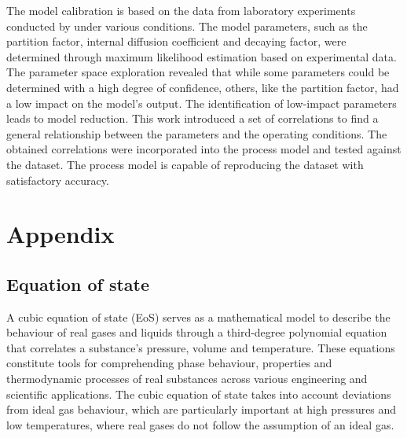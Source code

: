 \documentclass[a4paper,fleqn]{cas-dc}
\begin{document}
The model calibration is based on the data from laboratory experiments conducted by \citet{Povh2001} under various conditions. The model parameters, such as the partition factor, internal diffusion coefficient and decaying factor, were determined through maximum likelihood estimation based on experimental data. The parameter space exploration revealed that while some parameters could be determined with a high degree of confidence, others, like the partition factor, had a low impact on the model's output. The identification of low-impact parameters leads to model reduction. This work introduced a set of correlations to find a general relationship between the parameters and the operating conditions. The obtained correlations were incorporated into the process model and tested against the dataset. The process model is capable of reproducing the dataset with satisfactory accuracy.


\newpage
%



\clearpage \appendix \label{appendix}
\section{Appendix} 

\label{CH: Thermodynamic_details}

\subsection{Equation of state} \label{subsubsec: Equation of state}

A cubic equation of state (EoS) serves as a mathematical model to describe the behaviour of real gases and liquids through a third-degree polynomial equation that correlates a substance's pressure, volume and temperature. These equations constitute tools for comprehending phase behaviour, properties and thermodynamic processes of real substances across various engineering and scientific applications. The cubic equation of state takes into account deviations from ideal gas behaviour, which are particularly important at high pressures and low temperatures, where real gases do not follow the assumption of an ideal gas.
\end{document}
